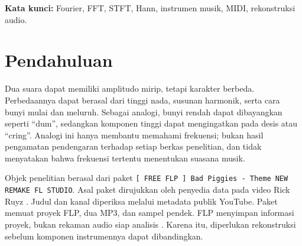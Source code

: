 \begin{abstract}
Penelitian ini membandingkan karakteristik bass, piano, gitar, brass,
dan tuba dalam aransemen ulang soundtrack \textit{Bad Piggies}.
Karena FL Studio tidak tersedia, data diperoleh dengan membaca not dan
susunan Playlist proyek FLP, mengekspornya ke MIDI, lalu merendernya
menggunakan FluidSynth dan SoundFont GeneralUser GS. Sebanyak 2219 not
berhasil direkonstruksi pada timeline yang sama. Objek penelitian adalah
komponen aransemen hasil rekonstruksi, bukan audio yang identik dengan
preset asli FL Studio. Analisis menggunakan representasi waktu, RMS,
DFT yang dihitung melalui FFT, serta STFT dengan jendela Hann 1024 dan
4096 sampel. Bass mempunyai sekitar $97{,}61\%$ energi di bawah 250 Hz,
sedangkan brass mempunyai sekitar $55{,}70\%$ energi di atas 1000 Hz.
Perbedaan waktu aktif menyebabkan RMS seluruh rekaman dan RMS saat
aktif memberikan gambaran berbeda. STFT memperlihatkan pergantian not
dan komponen yang bertahan, yang tidak langsung tampak pada spektrum
global. Variasi panjang jendela memperlihatkan kompromi lokalisasi
waktu dan frekuensi yang sesuai dengan Prinsip Ketaktentuan Heisenberg.
Konsistensi energi diperiksa dengan Parseval. Kanal DRUMS dan VOCALS
turut dianalisis dari WAV hasil dekode MP3. Konversi tersebut tidak
meningkatkan kualitas sumber; kedua kanal tetap menjadi pembanding
independen karena timeline berkas penuh belum diselaraskan dengan
rekonstruksi. Aktivitas VOCALS terkonsentrasi pada beberapa interval,
berbeda dari DRUMS yang aktif sepanjang sebagian besar rekaman.
\end{abstract}
\noindent\textbf{Kata kunci:} Fourier, FFT, STFT, Hann, instrumen musik,
MIDI, rekonstruksi audio.

\section{Pendahuluan}
Dua suara dapat memiliki amplitudo mirip, tetapi karakter berbeda.
Perbedaannya dapat berasal dari tinggi nada, susunan harmonik, serta
cara bunyi mulai dan meluruh. Sebagai analogi, bunyi rendah dapat
dibayangkan seperti ``dum'', sedangkan komponen tinggi dapat
mengingatkan pada desis atau ``cring''. Analogi ini hanya membantu
memahami frekuensi; bukan hasil pengamatan pendengaran terhadap setiap
berkas penelitian, dan tidak menyatakan bahwa frekuensi tertentu
menentukan suasana musik.

Objek penelitian berasal dari paket
\texttt{[ FREE FLP ] Bad Piggies - Theme NEW REMAKE FL STUDIO}.
Asal paket dirujukkan oleh penyedia data pada video Rick Ruyz
\cite{youtube}. Judul dan kanal diperiksa melalui metadata publik
YouTube. Paket memuat proyek FLP, dua MP3, dan sampel pendek. FLP
menyimpan informasi proyek, bukan rekaman audio siap analisis
\cite{flp}. Karena itu, diperlukan rekonstruksi sebelum komponen
instrumennya dapat dibandingkan.

